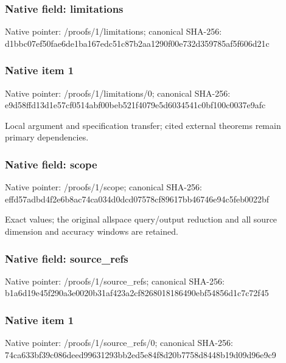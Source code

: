 \documentclass[10pt,a4paper]{article}
\begin{document}
\subsubsection{Native field: limitations}


Native pointer: /proofs/1/limitations; canonical SHA-256: d1bbc07ef50fae6de1ba167e\allowbreak{}dc51c87b2aa1290f00e732d3\allowbreak{}59785af5f606d21c



\subsubsection{Native item 1}


Native pointer: /proofs/1/limitations/0; canonical SHA-256: e9d58ffd13d1e57cf0514abf\allowbreak{}00beb521f4079e5d6034541c\allowbreak{}0bf100c0037e9afc


Local argument and specification transfer; cited external theorems remain primary dependencies.


\subsubsection{Native field: scope}


Native pointer: /proofs/1/scope; canonical SHA-256: effd57adbd4f2e6b8ac74ca0\allowbreak{}34d0dcd07578cf89617bb467\allowbreak{}46e94c5feb0022bf


Exact values; the original allspace query/output reduction and all source dimension and accuracy windows are retained.


\subsubsection{Native field: source\_refs}


Native pointer: /proofs/1/source\_refs; canonical SHA-256: b1a6d19e45f290a3e0020b31\allowbreak{}af423a2cf8268018186490eb\allowbreak{}f54856d1c7c72f45



\subsubsection{Native item 1}


Native pointer: /proofs/1/source\_refs/0; canonical SHA-256: 74ca633bf39c086deed99631\allowbreak{}293bb2ed5e84f8d20b7758d8\allowbreak{}448b19d09d96e9c9
\end{document}
